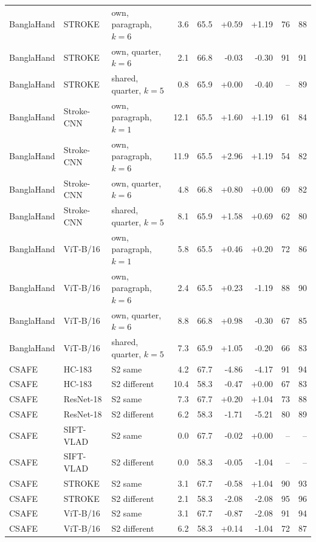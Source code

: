 \documentclass[10pt,a4paper]{article}
\begin{document}
{\begin{longtable}{lllrrrrrr}
BanglaHand & STROKE & own, paragraph, $k=6$ & 3.6 & 65.5 & +0.59 & +1.19 & 76 & 88 \\
BanglaHand & STROKE & own, quarter, $k=6$ & 2.1 & 66.8 & -0.03 & -0.30 & 91 & 91 \\
BanglaHand & STROKE & shared, quarter, $k=5$ & 0.8 & 65.9 & +0.00 & -0.40 & -- & 89 \\
BanglaHand & Stroke-CNN & own, paragraph, $k=1$ & 12.1 & 65.5 & +1.60 & +1.19 & 61 & 84 \\
BanglaHand & Stroke-CNN & own, paragraph, $k=6$ & 11.9 & 65.5 & +2.96 & +1.19 & 54 & 82 \\
BanglaHand & Stroke-CNN & own, quarter, $k=6$ & 4.8 & 66.8 & +0.80 & +0.00 & 69 & 82 \\
BanglaHand & Stroke-CNN & shared, quarter, $k=5$ & 8.1 & 65.9 & +1.58 & +0.69 & 62 & 80 \\
BanglaHand & ViT-B/16 & own, paragraph, $k=1$ & 5.8 & 65.5 & +0.46 & +0.20 & 72 & 86 \\
BanglaHand & ViT-B/16 & own, paragraph, $k=6$ & 2.4 & 65.5 & +0.23 & -1.19 & 88 & 90 \\
BanglaHand & ViT-B/16 & own, quarter, $k=6$ & 8.8 & 66.8 & +0.98 & -0.30 & 67 & 85 \\
BanglaHand & ViT-B/16 & shared, quarter, $k=5$ & 7.3 & 65.9 & +1.05 & -0.20 & 66 & 83 \\
\midrule
CSAFE & HC-183 & S2 same & 4.2 & 67.7 & -4.86 & -4.17 & 91 & 94 \\
CSAFE & HC-183 & S2 different & 10.4 & 58.3 & -0.47 & +0.00 & 67 & 83 \\
CSAFE & ResNet-18 & S2 same & 7.3 & 67.7 & +0.20 & +1.04 & 73 & 88 \\
CSAFE & ResNet-18 & S2 different & 6.2 & 58.3 & -1.71 & -5.21 & 80 & 89 \\
CSAFE & SIFT-VLAD & S2 same & 0.0 & 67.7 & -0.02 & +0.00 & -- & -- \\
CSAFE & SIFT-VLAD & S2 different & 0.0 & 58.3 & -0.05 & -1.04 & -- & -- \\
CSAFE & STROKE & S2 same & 3.1 & 67.7 & -0.58 & +1.04 & 90 & 93 \\
CSAFE & STROKE & S2 different & 2.1 & 58.3 & -2.08 & -2.08 & 95 & 96 \\
CSAFE & ViT-B/16 & S2 same & 3.1 & 67.7 & -0.87 & -2.08 & 91 & 94 \\
CSAFE & ViT-B/16 & S2 different & 6.2 & 58.3 & +0.14 & -1.04 & 72 & 87 \\
\bottomrule
\end{longtable}
}
\end{document}

